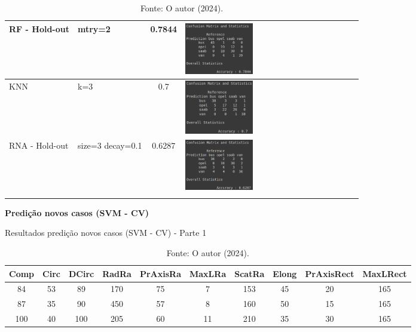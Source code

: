 \begin{longtable}{|>{\centering\arraybackslash}p{2.5cm}|>{\centering\arraybackslash}m{2.5cm}|c|m{7cm}|}
\hline
RF - Hold-out    & mtry=2 & 0.7844 & \includegraphics[width=0.4\textwidth]{apendices/fig/8_IAA008_5.png} \\
\hline
KNN    & k=3 & 0.7 & \includegraphics[width=0.4\textwidth]{apendices/fig/8_IAA008_6.png} \\
\hline
RNA - Hold-out    & size=3 decay=0.1 & 0.6287 & \includegraphics[width=0.4\textwidth]{apendices/fig/8_IAA008_7.png} \\
\hline
\caption*{Fonte: O autor (2024).}
\end{longtable}


\begin{center}
    \textbf{Predição novos casos (SVM - CV)}
\end{center}

\begin{table}[H]
\caption{Resultados predição novos casos (SVM - CV) - Parte 1}
\hspace*{-1.5cm} %
\begin{minipage}{\textwidth}
\centering
\begin{tabular}{|c|c|c|c|c|c|c|c|c|c|}
\hline
Comp & Circ & DCirc & RadRa & PrAxisRa & MaxLRa & ScatRa & Elong & PrAxisRect & MaxLRect \\
\hline
84   & 53   & 89    & 170   & 75       & 7      & 153    & 45    & 20         & 165 \\
\hline
87   & 35   & 90    & 450   & 57       & 8      & 160    & 50    & 15         & 165 \\
\hline
100  & 40   & 100   & 205   & 60       & 11     & 210    & 35    & 30         & 165 \\
\hline
\end{tabular}
\end{minipage}
\caption*{Fonte: O autor (2024).}
\end{table}

